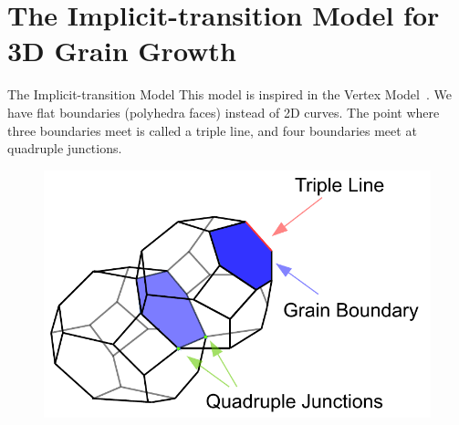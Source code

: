 \documentclass[usenames,dvipsnames]{beamer}
\begin{document}
\section[3D Implicit-transition Model]{The Implicit-transition Model for 3D Grain Growth}
\begin{frame}{The Implicit-transition Model}
    This model is inspired in the Vertex Model~\cite{torres2015}. We have {\color{MidnightBlue}flat boundaries} (polyhedra faces) instead of 2D curves. The point where three boundaries meet is called a {\color{Red}triple line}, and four boundaries meet at {\color{mygreen}quadruple junctions}.
    \begin{figure}
        \centering
        \includegraphics[scale=0.6]{figures/extras/3dscheme.pdf}
    \end{figure}
\end{frame}
\end{document}
